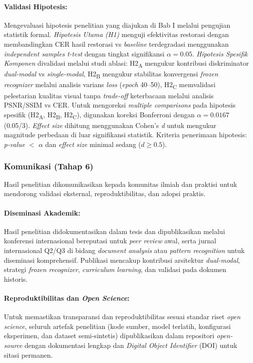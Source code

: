 \documentclass[12pt,a4paper]{article}
\begin{document}
\paragraph{Validasi Hipotesis:}
Mengevaluasi hipotesis penelitian yang diajukan di Bab I melalui pengujian statistik formal. \textit{Hipotesis Utama (H1)} menguji efektivitas restorasi dengan membandingkan CER hasil restorasi vs \textit{baseline} terdegradasi menggunakan \textit{independent samples t-test} dengan tingkat signifikansi $\alpha = 0.05$. \textit{Hipotesis Spesifik Komponen} divalidasi melalui studi ablasi: H2\textsubscript{A} mengukur kontribusi diskriminator \textit{dual-modal} vs \textit{single-modal}, H2\textsubscript{B} mengukur stabilitas konvergensi \textit{frozen recognizer} melalui analisis varians \textit{loss} (\textit{epoch} 40--50), H2\textsubscript{C} memvalidasi pelestarian kualitas visual tanpa \textit{trade-off} keterbacaan melalui analisis PSNR/SSIM vs CER. Untuk mengoreksi \textit{multiple comparisons} pada hipotesis spesifik (H2\textsubscript{A}, H2\textsubscript{B}, H2\textsubscript{C}), digunakan koreksi Bonferroni dengan $\alpha = 0.0167$ (0.05/3). \textit{Effect size} dihitung menggunakan Cohen's \textit{d} untuk mengukur magnitude perbedaan di luar signifikansi statistik. Kriteria penerimaan hipotesis: \textit{p-value} $<$ $\alpha$ dan \textit{effect size} minimal sedang ($d \geq 0.5$).

\subsubsection{Komunikasi (Tahap 6)}
Hasil penelitian dikomunikasikan kepada komunitas ilmiah dan praktisi untuk mendorong validasi eksternal, reproduktibilitas, dan adopsi praktis.

\paragraph{Diseminasi Akademik:}
Hasil penelitian didokumentasikan dalam tesis dan dipublikasikan melalui konferensi internasional bereputasi untuk \textit{peer review} awal, serta jurnal internasional Q2/Q3 di bidang \textit{document analysis} atau \textit{pattern recognition} untuk diseminasi komprehensif. Publikasi mencakup kontribusi arsitektur \textit{dual-modal}, strategi \textit{frozen recognizer}, \textit{curriculum learning}, dan validasi pada dokumen historis.

\paragraph{Reproduktibilitas dan \textit{Open Science}:}
Untuk memastikan transparansi dan reproduktibilitas sesuai standar riset \textit{open science}, seluruh artefak penelitian (kode sumber, model terlatih, konfigurasi eksperimen, dan dataset semi-sintetis) dipublikasikan dalam repositori \textit{open-source} dengan dokumentasi lengkap dan \textit{Digital Object Identifier} (DOI) untuk sitasi permanen.
\end{document}
